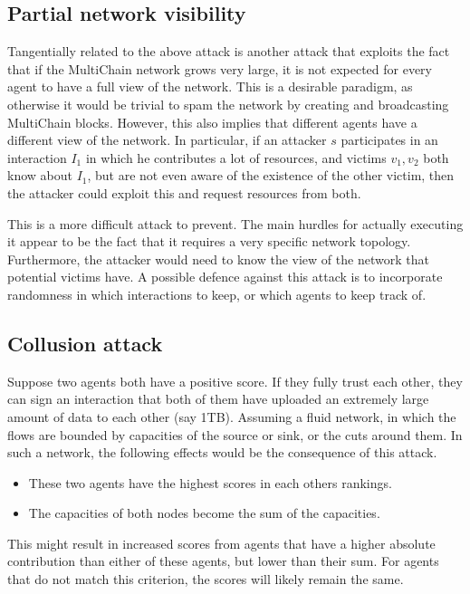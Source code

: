 \documentclass[a4paper,11pt]{book}
\theoremstyle{definition}
\begin{document}
\subsection{Partial network visibility}

Tangentially related to the above attack is another attack that exploits the fact that if the MultiChain
network grows very large, it is not expected for every agent to have a full view of the network. This
is a desirable paradigm, as otherwise it would be trivial to spam the network by creating and broadcasting
MultiChain blocks. However, this also implies that different agents have a different view of the network.
In particular, if an attacker $s$ participates in an interaction $I_1$ in which he contributes a lot
of resources, and victims $v_1, v_2$ both know about $I_1$, but are not even aware of the existence of
the other victim, then the attacker could exploit this and request resources from both. 

This is a more difficult attack to prevent. The main hurdles for actually executing it appear to be
the fact that it requires a very specific network topology. Furthermore, the attacker would need to
know the view of the network that potential victims have. A possible defence against this attack is
to incorporate randomness in which interactions to keep, or which agents to keep track of.

\subsection{Collusion attack}

Suppose two agents both have a positive score. If they 
fully trust each other, they can sign an interaction that both of them have uploaded an extremely large
amount of data to each other (say 1TB). Assuming a fluid network,
in which the flows are bounded by capacities of the source or sink, or the cuts around them.
In such a network, the following effects would be the consequence of this attack.

\begin{itemize}
    \item These two agents have the highest scores in each others rankings. 
    \item The capacities of both nodes become the sum of the capacities.
\end{itemize}

This might result in increased scores from agents that have a higher absolute contribution
than either of these agents, but lower than their sum. For agents that do not match this
criterion, the scores will likely remain the same.
\end{document}
